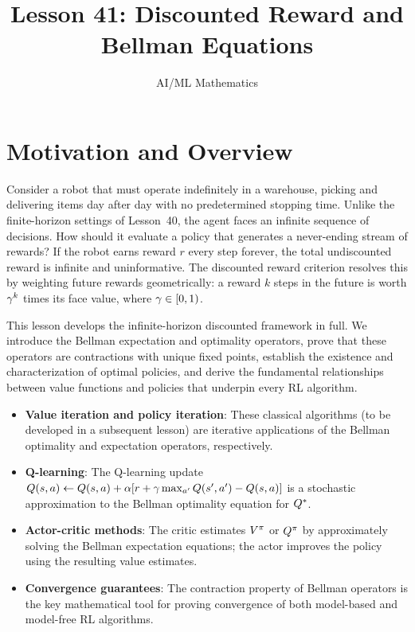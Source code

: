 \documentclass[11pt,a4paper]{article}
\title{Lesson 41: Discounted Reward and Bellman Equations}
\author{AI/ML Mathematics}
\date{}
\begin{document}
\maketitle
\tableofcontents
\newpage


\section{Motivation and Overview}
\label{sec:motivation}

Consider a robot that must operate indefinitely in a warehouse,
picking and delivering items day after day with no predetermined
stopping time. Unlike the finite-horizon settings of Lesson~40,
the agent faces an infinite sequence of decisions. How should it
evaluate a policy that generates a never-ending stream of rewards?
If the robot earns reward $r$ every step forever, the total
undiscounted reward is infinite and uninformative. The discounted
reward criterion resolves this by weighting future rewards
geometrically: a reward $k$ steps in the future is worth
$\gamma^k$ times its face value, where $\gamma \in [0,1)$.

This lesson develops the infinite-horizon discounted framework in
full. We introduce the Bellman expectation and optimality operators,
prove that these operators are contractions with unique fixed points,
establish the existence and characterization of optimal policies, and
derive the fundamental relationships between value functions and
policies that underpin every RL algorithm.

\begin{rlconnection}[title={Why the Discounted Bellman Framework
    Matters for RL/ML}]
\begin{itemize}[nosep]
    \item \textbf{Value iteration and policy iteration}: These
    classical algorithms (to be developed in a subsequent lesson)
    are iterative applications of the Bellman optimality and
    expectation operators, respectively.
    \item \textbf{Q-learning}: The Q-learning update
    $Q(s,a) \leftarrow Q(s,a) + \alpha[r + \gamma \max_{a'}
    Q(s',a') - Q(s,a)]$ is a stochastic approximation to the
    Bellman optimality equation for $Q^*$.
    \item \textbf{Actor-critic methods}: The critic estimates $V^{\pi}$
    or $Q^{\pi}$ by approximately solving the Bellman expectation
    equations; the actor improves the policy using the resulting
    value estimates.
    \item \textbf{Convergence guarantees}: The contraction property
    of Bellman operators is the key mathematical tool for proving
    convergence of both model-based and model-free RL algorithms.
\end{itemize}
\end{rlconnection}
\end{document}
